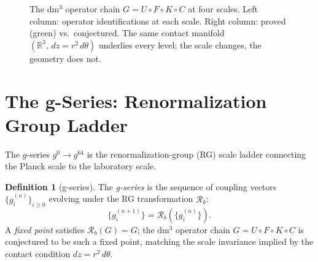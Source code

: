 \documentclass[12pt,a4paper]{article}
\theoremstyle{plain}
\theoremstyle{definition}
\newtheorem{definition}[theorem]{Definition}
\theoremstyle{remark}
\begin{document}
\begin{figure}[h]
\caption{The dm$^3$ operator chain $G=U\circ F\circ K\circ C$ at four scales.
Left column: operator identifications at each scale.
Right column: proved (green) vs.\ conjectured.
The same contact manifold $(\mathbb{R}^3,\,dz=r^2\,d\theta)$ underlies every
level; the scale changes, the geometry does not.}
\label{fig:scales}
\end{figure}

\section{The g-Series: Renormalization Group Ladder}
\label{sec:gseries}

The $g$-series $g^0\to g^{64}$ is the renormalization-group (RG) scale ladder
connecting the Planck scale to the laboratory scale.

\begin{definition}[g-series]
The \emph{g-series} is the sequence of coupling vectors $\{g_i^{(n)}\}_{i\geq0}$
evolving under the RG transformation $\mathcal{R}_b$:
\[
  \{g_i^{(n+1)}\} = \mathcal{R}_b(\{g_i^{(n)}\}).
\]
A \emph{fixed point} satisfies $\mathcal{R}_b(G)=G$; the dm$^3$ operator chain
$G=U\circ F\circ K\circ C$ is conjectured to be such a fixed point, matching
the scale invariance implied by the contact condition $dz=r^2\,d\theta$.
\end{definition}
\end{document}
